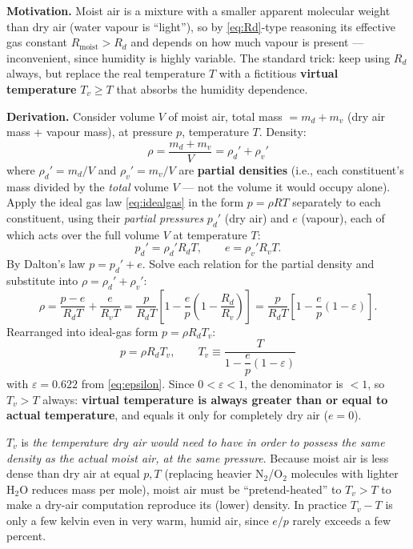 \documentclass[11pt]{article}
\newcommand{\Rd}{R_d}
\newcommand{\Rv}{R_v}
\begin{document}
\textbf{Motivation.} Moist air is a mixture with a smaller apparent molecular weight than dry air (water vapour is ``light''), so by \eqref{eq:Rd}-type reasoning its effective gas constant $R_{\text{moist}} > \Rd$ and depends on how much vapour is present — inconvenient, since humidity is highly variable. The standard trick: keep using $\Rd$ always, but replace the real temperature $T$ with a fictitious \textbf{virtual temperature} $T_v \ge T$ that absorbs the humidity dependence.

\textbf{Derivation.} Consider volume $V$ of moist air, total mass $= m_d + m_v$ (dry air mass + vapour mass), at pressure $p$, temperature $T$. Density:
\begin{equation}
\rho = \frac{m_d+m_v}{V} = \rho_d' + \rho_v'
\end{equation}
where $\rho_d' = m_d/V$ and $\rho_v'=m_v/V$ are \textbf{partial densities} (i.e., each constituent's mass divided by the \emph{total} volume $V$ — not the volume it would occupy alone). Apply the ideal gas law \eqref{eq:idealgas} in the form $p=\rho RT$ separately to each constituent, using their \emph{partial pressures} $p_d'$ (dry air) and $e$ (vapour), each of which acts over the full volume $V$ at temperature $T$:
\begin{equation}
p_d' = \rho_d' \Rd T, \qquad e = \rho_v' \Rv T.
\end{equation}
By Dalton's law $p = p_d' + e$. Solve each relation for the partial density and substitute into $\rho = \rho_d'+\rho_v'$:
\begin{equation}
\rho = \frac{p-e}{\Rd T} + \frac{e}{\Rv T} = \frac{p}{\Rd T}\left[1 - \frac{e}{p}\left(1-\frac{\Rd}{\Rv}\right)\right] = \frac{p}{\Rd T}\left[1-\frac{e}{p}(1-\varepsilon)\right].
\end{equation}
Rearranged into ideal-gas form $p=\rho \Rd T_v$:
\begin{equation}
\boxed{p = \rho \Rd T_v}, \qquad
\boxed{T_v \equiv \dfrac{T}{1-\dfrac{e}{p}(1-\varepsilon)}}
\label{eq:Tv}
\end{equation}
with $\varepsilon = 0.622$ from \eqref{eq:epsilon}. Since $0<\varepsilon<1$, the denominator is $<1$, so $T_v > T$ always: \textbf{virtual temperature is always greater than or equal to actual temperature}, and equals it only for completely dry air ($e=0$).

\begin{defbox}
$T_v$ is \emph{the temperature dry air would need to have in order to possess the same density as the actual moist air, at the same pressure}. Because moist air is less dense than dry air at equal $p,T$ (replacing heavier N$_2$/O$_2$ molecules with lighter H$_2$O reduces mass per mole), moist air must be ``pretend-heated'' to $T_v>T$ to make a dry-air computation reproduce its (lower) density. In practice $T_v-T$ is only a few kelvin even in very warm, humid air, since $e/p$ rarely exceeds a few percent.
\end{defbox}
\end{document}
